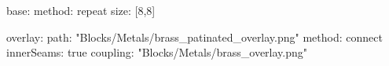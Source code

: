 base:
  method: repeat
  size: [8,8]
  
overlay:
  path: "Blocks/Metals/brass_patinated_overlay.png"
  method: connect
  innerSeams: true
  coupling: "Blocks/Metals/brass_overlay.png"